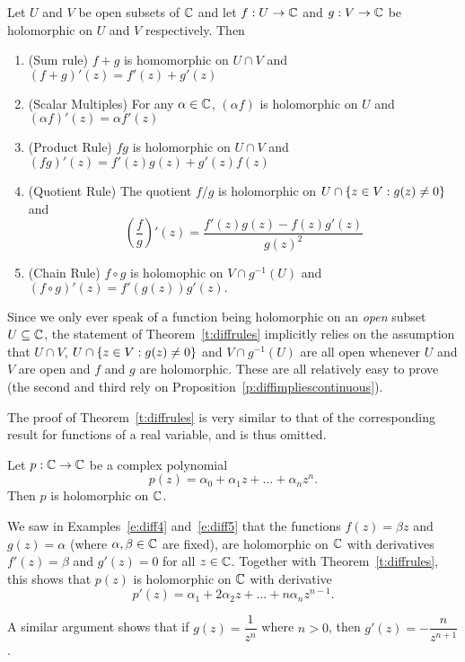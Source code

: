\begin{theorem}
\label{t:diffrules}
Let $U$ and $V$ be open subsets of $\mathbb{C}$ and let $f:U \to \mathbb{C}$ and $g:V \to \mathbb{C}$ be holomorphic on $U$ and $V$ respectively.  Then
\begin{enumerate}
\item (Sum rule) $f+g$ is homomorphic on $U \cap V$ and $(f+g)'(z)=f'(z)+g'(z)$
\item (Scalar Multiples) For any $\alpha \in \mathbb{C}$, $(\alpha f )$ is holomorphic on $U$ and $(\alpha f)' (z) = \alpha f'(z)$
\item (Product Rule) $fg$ is holomorphic on $U \cap V$ and $(fg)'(z)=f'(z)g(z)+g'(z)f(z)$
\item (Quotient Rule) The quotient $f/g$ is holomorphic on $U \cap \left\{ z \in V: g(z) \neq 0\right\}$ and 
\[
\left( \frac{f}{g} \right) '(z) = \frac{f'(z)g(z)-f(z)g'(z)}{g(z)^2}
\]
\item (Chain Rule) $f \circ g$ is holomophic on $V \cap g^{-1}(U)$ and $(f\circ g)'(z) = f'(g(z))g'(z).$
\end{enumerate}
\end{theorem}

Since we only ever speak of a function being holomorphic on an \emph{open} subset $U \subseteq \mathbb{C}$, the statement of Theorem~\ref{t:diffrules} implicitly relies on the assumption that $U \cap V$, $U \cap \left\{ z \in V: g(z) \neq 0 \right\}$ and $V \cap g^{-1} (U)$ are all open whenever $U$ and $V$ are open and $f$ and $g$ are holomorphic.  These are all relatively easy to prove (the second and third rely on Proposition~\ref{p:diffimpliescontinuous}).

The proof of Theorem~\ref{t:diffrules} is very similar to that of the corresponding result for functions of a real variable, and is thus omitted.

\begin{example}
 Let $p:\mathbb{C} \to \mathbb{C}$ be a complex polynomial
\[
p(z) = \alpha_0 + \alpha_1z + \ldots + \alpha_n z^n.
\]
Then $p$ is holomorphic on $\mathbb{C}$.
\end{example}

\begin{solution}
We saw in Examples~\ref{e:diff4} and~\ref{e:diff5} that the functions $f(z) = \beta z$ and $g(z)= \alpha$ (where $\alpha, \beta \in \mathbb{C}$ are fixed), are holomorphic on $\mathbb{C}$ with derivatives $f'(z) = \beta$ and $g'(z)=0$ for all $z \in \mathbb{C}$.  Together with Theorem~\ref{t:diffrules}, this shows that $p(z)$ is holomorphic on $\mathbb{C}$ with derivative
\[
p'(z) = \alpha_1 + 2\alpha_2 z + \ldots + n \alpha_n z^{n-1}.
\]
\end{solution}
\begin{note}
A similar argument shows that if $g(z) = \dfrac{1}{z^n}$ where $n >0$, then $g'(z) = -\dfrac{n}{z^{n+1}}$.
\end{note}

